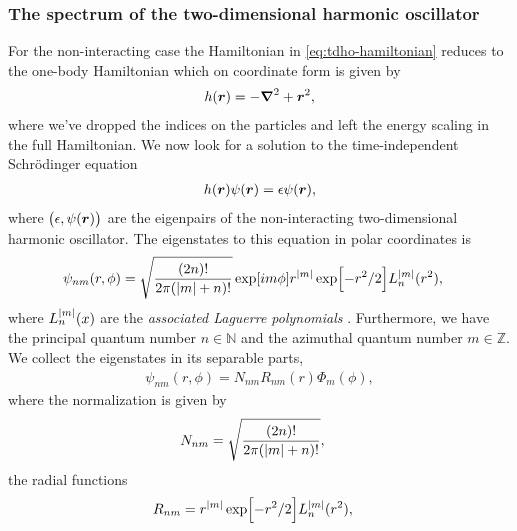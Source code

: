         \subsubsection{The spectrum of the two-dimensional harmonic oscillator}
            For the non-interacting case the Hamiltonian in
            \autoref{eq:tdho-hamiltonian} reduces to the one-body Hamiltonian
            which on coordinate form is given by
            \begin{align}
                h(\boldsymbol{r})
                = -\boldsymbol{\nabla}^2 + \boldsymbol{r}^2,
                \label{eq:tdho-one-body-hamiltonian}
            \end{align}
            where we've dropped the indices on the particles and left the energy
            scaling in the full Hamiltonian.
            We now look for a solution to the time-independent Schrödinger equation
            \begin{align}
                h(\boldsymbol{r})\psi(\boldsymbol{r}) = \epsilon \psi(\boldsymbol{r}),
            \end{align}
            where $\left( \epsilon, \psi(\boldsymbol{r}) \right)$ are the eigenpairs of the
            non-interacting two-dimensional harmonic oscillator.
            The eigenstates to this equation in polar coordinates is
            \begin{align}
                \psi_{nm}(r, \phi)
                &= \sqrt{\frac{(2n)!}{2\pi(\abs{m} + n)!}}
                \exp[i m \phi]
                r^{\abs{m}}
                \exp[-r^2 / 2]
                L^{\abs{m}}_{n}(r^2),
                \label{eq:eigenstate-tdho}
            \end{align}
            where $L^{\abs{m}}_{n}(x)$ are the \emph{associated Laguerre
            polynomials} \cite{anisimovas1998energy}.
            Furthermore, we have the principal quantum number $n \in \mathbb{N}$
            and the azimuthal quantum number $m \in \mathbb{Z}$.
            We collect the eigenstates in its separable parts,
            \begin{align}
                \psi_{nm}(r, \phi)
                = N_{nm} R_{nm}(r) \Phi_{m}(\phi),
            \end{align}
            where the normalization is given by
            \begin{align}
                N_{nm}
                &= \sqrt{\frac{(2n)!}{2\pi(\abs{m} + n)!}},
            \end{align}
            the radial functions
            \begin{align}
                R_{nm}
                &=
                r^{\abs{m}}
                \exp[-r^2 / 2]
                L^{\abs{m}}_{n}(r^2),
                \label{eq:radial-function-tdho}
            \end{align}
